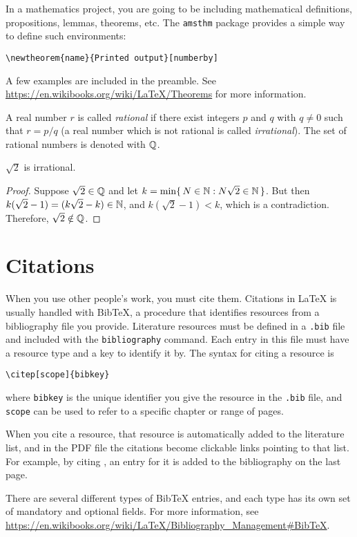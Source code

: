 In a mathematics project, you are going to be including mathematical definitions, propositions, lemmas, theorems, etc.
The \texttt{amsthm} package provides a simple way to define such environments:
%
\begin{verbatim}
\newtheorem{name}{Printed output}[numberby]
\end{verbatim}
%
A few examples are included in the preamble.
See \url{https://en.wikibooks.org/wiki/LaTeX/Theorems} for more information.
%
\begin{defn}
  A real number \(r\) is called \emph{rational} if there exist integers \(p\) and \(q\) with \(q \neq 0\) such that \(r = p/q\)
  (a real number which is not rational is called \emph{irrational}).
  The set of rational numbers is denoted with \(\mathbb{Q}\).
\end{defn}
%
\begin{thm}
  \(\sqrt{2}\) is irrational.
\end{thm}
%
\begin{proof}
  Suppose \(\sqrt{2} \in \mathbb{Q}\) and let \(k = \min\{\, N \in \mathbb{N} : N\sqrt{2} \in \mathbb{N} \,\}\).
  But then \(k (\sqrt{2} - 1) = (k\sqrt{2} - k) \in \mathbb{N}\), and \(k(\sqrt{2} - 1) < k\), which is a contradiction.
  Therefore, \(\sqrt{2} \notin \mathbb{Q}\).
\end{proof}


\section{Citations}
\label{sec:citations}

When you use other people's work, you must cite them.
Citations in \LaTeX{} is usually handled with BibTeX, a procedure that identifies resources from a bibliography file you provide.
Literature resources must be defined in a \texttt{.bib} file and included with the \verb!bibliography! command.
Each entry in this file must have a resource type and a key to identify it by.
The syntax for citing a resource is
%
\begin{verbatim}
\citep[scope]{bibkey}
\end{verbatim}
%
where \texttt{bibkey} is the unique identifier you give the resource in the \texttt{.bib} file, and \texttt{scope} can be used to refer to a specific chapter or range of pages.

When you cite a resource, that resource is automatically added to the literature list, and in the PDF file the citations become clickable links pointing to that list.
For example, by citing \citep[pp. 104-110]{edpenn}, an entry for it is added to the bibliography on the last page.

There are several different types of BibTeX entries, and each type has its own set of mandatory and optional fields.
For more information, see \url{https://en.wikibooks.org/wiki/LaTeX/Bibliography_Management#BibTeX}.
